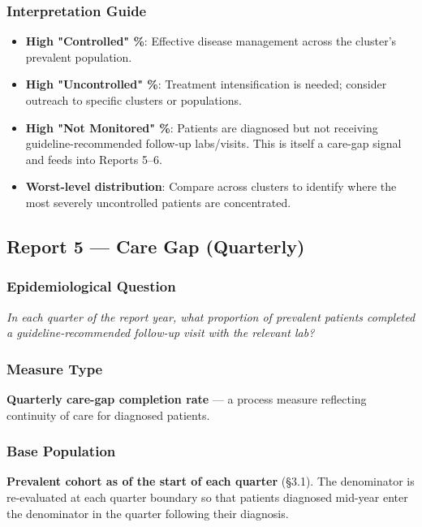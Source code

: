 \documentclass[11pt,a4paper]{article}
\begin{document}
\subsubsection{Interpretation Guide}

\begin{itemize}[leftmargin=*]
    \item \textbf{High "Controlled" \%}: Effective disease management across the cluster's prevalent population.
    \item \textbf{High "Uncontrolled" \%}: Treatment intensification is needed; consider outreach to specific clusters or populations.
    \item \textbf{High "Not Monitored" \%}: Patients are diagnosed but not receiving guideline-recommended follow-up labs/visits. This is itself a care-gap signal and feeds into Reports 5--6.
    \item \textbf{Worst-level distribution}: Compare across clusters to identify where the most severely uncontrolled patients are concentrated.
\end{itemize}

\subsection{Report 5 --- Care Gap (Quarterly)}

\subsubsection{Epidemiological Question}
\textit{In each quarter of the report year, what proportion of prevalent patients completed a guideline-recommended follow-up visit with the relevant lab?}

\subsubsection{Measure Type}
\textbf{Quarterly care-gap completion rate} --- a process measure reflecting continuity of care for diagnosed patients.

\subsubsection{Base Population}
\textbf{Prevalent cohort as of the start of each quarter} (§3.1). The denominator is re-evaluated at each quarter boundary so that patients diagnosed mid-year enter the denominator in the quarter following their diagnosis.
\end{document}
